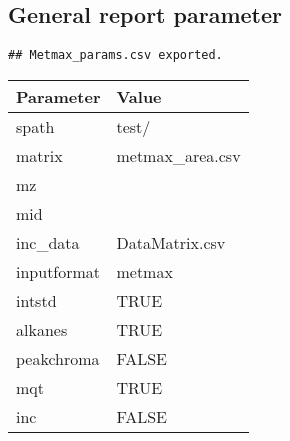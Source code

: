 \documentclass[9pt,]{article}
\begin{document}
\pagebreak

\subsection{General report parameter}\label{general-report-parameter}

\begin{verbatim}
## Metmax_params.csv exported.
\end{verbatim}

\begin{longtable}[]{@{}ll@{}}
\toprule
Parameter & Value\tabularnewline
\midrule
\endhead
spath & test/\tabularnewline
matrix & metmax\_area.csv\tabularnewline
mz &\tabularnewline
mid &\tabularnewline
inc\_data & DataMatrix.csv\tabularnewline
inputformat & metmax\tabularnewline
intstd & TRUE\tabularnewline
alkanes & TRUE\tabularnewline
peakchroma & FALSE\tabularnewline
mqt & TRUE\tabularnewline
inc & FALSE\tabularnewline
\bottomrule
\end{longtable}
\newpage
\singlespacing 
\end{document}
